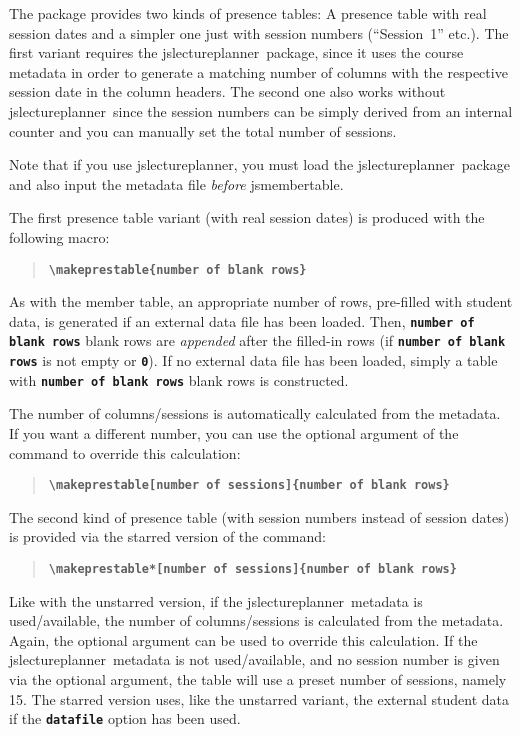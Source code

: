 \documentclass[english]{article}
\newcommand*\jmacro[1]{\textbf{\texttt{#1}}}
\newcommand*\jcsmacro[1]{\jmacro{\textbackslash{#1}}}
\newcommand*\joption[1]{\textbf{\texttt{#1}}}
\newcommand*\jparam[1]{\angus #1\angud}
\newcommand*\jslp{\textsf{jslectureplanner}}
\newcommand*\jsmt{\textsf{jsmembertable}}
\begin{document}
The package provides two kinds of presence tables: A presence table with real session dates
and a simpler one just with session numbers (``Session~1'' etc.). The first variant requires
the \jslp\ package, since it uses the course metadata in order to generate a matching number
of columns with the respective session date in the column headers. The second one also works
without \jslp\, since the session numbers can be simply derived from an internal counter and
you can manually set the total number of sessions.

Note that if you use \jslp, you must load the \jslp\ package and also input the metadata file
\emph{before} \jsmt.

The first presence table variant (with real session dates) is produced with the following macro:

\begin{quote}
\jcsmacro{makeprestable\{\jparam{number of blank rows}\}}
\end{quote}
As with the member table, an appropriate number of rows, pre-filled with student data, is
generated if an external data file has been loaded. Then, \joption{\jparam{number of blank rows}}
blank rows are \emph{appended} after the filled-in rows (if \joption{\jparam{number of blank rows}}
is not empty or \joption{0}). If no external data file has been loaded, simply a table with
\joption{\jparam{number of blank rows}} blank rows is constructed.

The number of columns/sessions is automatically calculated from the metadata. If you want a different
number, you can use the optional argument of the command to override this calculation:

\begin{quote}
\jcsmacro{makeprestable[\jparam{number of sessions}]\{\jparam{number of blank rows}\}}
\end{quote}
The second kind of presence table (with session numbers instead of session dates) is provided
via the starred version of the command:

\begin{quote}
\jcsmacro{makeprestable*[\jparam{number of sessions}]\{\jparam{number of blank rows}\}}
\end{quote}
Like with the unstarred version, if the \jslp\
metadata is used/available, the number of columns/sessions is calculated from the metadata.
Again, the optional argument can be used to override this calculation.
If the \jslp\ metadata is not used/available, and no session number is given via the optional
argument, the table will use a preset number of sessions, namely 15. The starred version uses,
like the unstarred variant, the external student data if the \joption{datafile} option has been
used.
\end{document}

